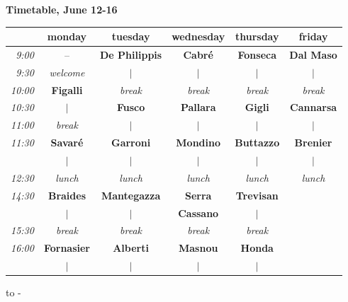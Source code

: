 \documentclass[a4paper, 12pt, oneside]{book}
\def\hrulefill{\leavevmode\leaders\hrule height 0.1pt\hfill\kern 0pt}
\newcommand\Linepage[1][0.3in]{%
  \vbox to \dimexpr\textheight-\pagetotal-#1\relax {%
    \leaders\hbox to \linewidth{\rule{0pt}{#1}\hrulefill}\vfil
  }%
}
\begin{document}
\newpage
\mbox{}
\newpage
\begin{center}
\textbf{\large Timetable, June 12-16}
\vskip 0.5cm
\begin{tabular}{|r|ccccc|}
\hline
\it   & monday & tuesday & wednesday & thursday & friday \\
\hline
\it 9:00  & -- & \bf De Philippis & \bf Cabré & \bf Fonseca & \bf Dal Maso \\ 
\it 9:30  & \it welcome & $\vert$ & $\vert$ & $\vert$ & $\vert$ \\ 
\it 10:00 & \bf Figalli & \it break & \it break & \it break & \it break \\
\it 10:30 & $\vert$ & \bf Fusco & \bf Pallara & \bf Gigli & \bf Cannarsa \\
\it 11:00 & \it break & $\vert$ & $\vert$ & $\vert$ & $\vert$ \\
\it 11:30 & \bf Savaré & \bf Garroni & \bf Mondino & \bf Buttazzo & \bf Brenier \\
          & $\vert$ & $\vert$ & $\vert$ & $\vert$ & $\vert$ \\
\hline
\it 12:30 & \it lunch & \it lunch & \it lunch & \it lunch & \it lunch \\
\hline
\it 14:30 & \bf Braides & \bf \bf Mantegazza & \bf Serra & \bf Trevisan & \\
          & $\vert$ & $\vert$ & \bf Cassano & $\vert$ & \\
\it 15:30 & \it break & \it break & \it break & \it break & \\
\it 16:00 & \bf Fornasier & \bf \bf Alberti & \bf Masnou & \bf Honda & \\
 & $\vert$ & $\vert$ & $\vert$ & $\vert$ & \\
\hline
\end{tabular}
\end{center}
{\Linepage}
\end{document}
